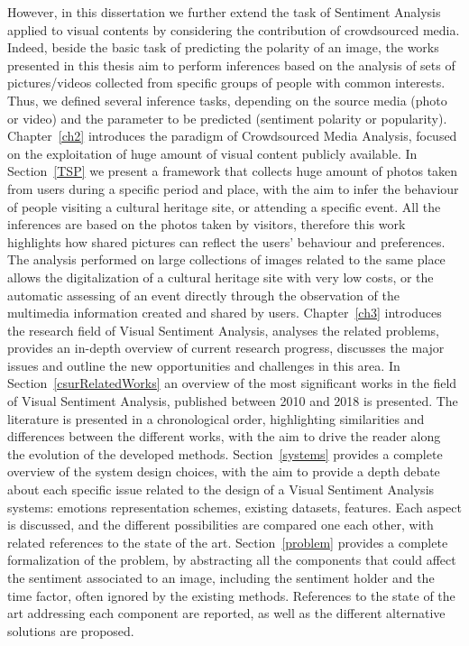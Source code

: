 However, in this dissertation we further extend the task of Sentiment Analysis applied to visual contents by considering the contribution of crowdsourced media. Indeed, beside the basic task of predicting the polarity of an image, the works presented in this thesis aim to perform inferences based on the analysis of sets of pictures/videos collected from specific groups of people with common interests. Thus, we defined several inference tasks, depending on the source media (photo or video) and the parameter to be predicted (sentiment polarity or popularity). 
Chapter~\ref{ch2} introduces the paradigm of Crowdsourced Media Analysis, focused on the exploitation of huge amount of visual content publicly available.
In Section~\ref{TSP} we present a framework that collects huge amount of photos taken from users during a specific period and place, with the aim to infer the behaviour of people visiting a cultural heritage site, or attending a specific event. All the inferences are based on the photos taken by visitors, therefore this work highlights how shared pictures can reflect the users' behaviour and preferences. The analysis performed on large collections of images related to the same place allows the digitalization of a cultural heritage site with very low costs, or the automatic assessing of an event directly through the observation of the multimedia information created and shared by users. 
Chapter~\ref{ch3} introduces the research field of Visual Sentiment Analysis, analyses the related problems, provides an in-depth overview of current research progress, discusses the major issues and outline the new opportunities and challenges in this area.
In Section~\ref{csurRelatedWorks} an overview of the most significant works in the field of Visual Sentiment Analysis, published between 2010 and 2018 is presented. The literature is presented in a chronological order, highlighting similarities and differences between the different works, with the aim to drive the reader along the evolution of the developed methods.
Section~\ref{systems} provides a complete overview of the system design choices, with the aim to provide a depth debate about each specific issue related to the design of a Visual Sentiment Analysis systems: emotions representation schemes, existing datasets, features. Each aspect is discussed, and the different possibilities are compared one each other, with related references to the state of the art.
Section~\ref{problem} provides a complete formalization of the problem, by abstracting all the components that could affect the sentiment associated to an image, including the sentiment holder and the time factor, often ignored by the existing methods. References to the state of the art addressing each component are reported, as well as the different alternative solutions are proposed.
